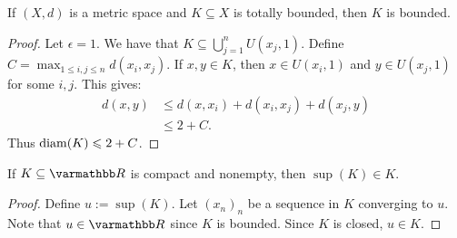    \begin{proposition}
        If $(X,d)$ is a metric space and $K \subseteq X$ is totally bounded, then $K$ is bounded.
    \end{proposition}
        \begin{proof}
            Let $\epsilon = 1$. We have that $K \subseteq \bigcup_{j = 1}^n U(x_j,1)$. Define $C = \max_{1 \leq i,j \leq n}d(x_i,x_j)$. If $x,y \in K$, then $x \in U(x_i,1)$ and $y \in U(x_j,1)$ for some $i,j$. This gives:
                \begin{equation*}
                \begin{split}
                    d(x,y)
                    & \leq d(x,x_i) + d(x_i,x_j) + d(x_j,y) \\
                    & \leq 2 + C.
                \end{split}
                \end{equation*}
            Thus $\operatorname{diam}(K) \leqslant 2+C$.
        \end{proof}

    \begin{corollary}\label{cor:compact-sup}
        If $K \subseteq \bfR$ is compact and nonempty, then $\sup(K) \in K$.
    \end{corollary}
        \begin{proof}
            Define $u:= \sup(K)$. Let $(x_n)_n$ be a sequence in $K$ converging to $u$. Note that $u \in \bfR$ since $K$ is bounded. Since $K$ is closed, $u \in K$.
        \end{proof}

